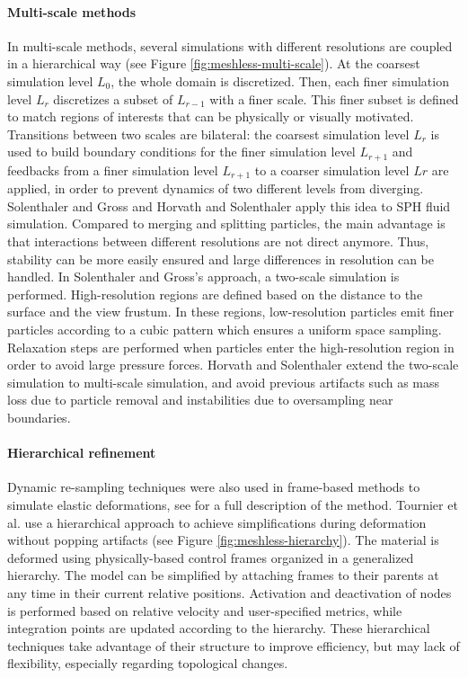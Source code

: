 \paragraph*{Multi-scale methods}
In multi-scale methods, several simulations with different resolutions are coupled in a hierarchical way (see Figure \ref{fig:meshless-multi-scale}).
At the coarsest simulation level $L_{0}$, the whole domain is discretized. Then, each finer simulation level $L_{r}$ discretizes a subset of $L_{r-1}$ with a finer scale. This finer subset is defined to match regions of interests that can be physically or visually motivated. Transitions between two scales are bilateral: the coarsest simulation level $L_{r}$ is used to build boundary conditions for the finer simulation level $L_{r+1}$ and feedbacks from a finer simulation level $L_{r+1}$ to a coarser simulation level $L{r}$ are applied, in order to prevent dynamics of two different levels from diverging. Solenthaler and Gross \cite{Solenthaler2011} and Horvath and Solenthaler \cite{Horvath2013} apply this idea to SPH fluid simulation.
Compared to merging and splitting particles, the main advantage is that interactions between different resolutions are not direct anymore. Thus, stability can be more easily ensured and large differences in resolution can be handled.
In Solenthaler and Gross's approach, a two-scale simulation is performed. High-resolution regions are defined based on the distance to the surface and the view frustum. In these regions, low-resolution particles emit finer particles according to a cubic pattern which ensures a uniform space sampling. Relaxation steps are performed when particles enter the high-resolution region in order to avoid large pressure forces. Horvath and Solenthaler extend the two-scale simulation to multi-scale simulation, and avoid previous artifacts such as mass loss due to particle removal and instabilities due to oversampling near boundaries.

\paragraph*{Hierarchical refinement}
Dynamic re-sampling techniques were also used in frame-based methods to simulate elastic deformations, see \cite{Gilles2011} for a full description of the method. Tournier et al. \cite{Tournier2014} use a hierarchical approach to achieve simplifications during deformation without popping artifacts (see Figure \ref{fig:meshless-hierarchy}). The material is deformed using physically-based control frames organized in a generalized hierarchy. The model can be simplified by attaching frames to their parents at any time in their current relative positions. Activation and deactivation of nodes is performed based on relative velocity and user-specified metrics, while integration points are updated according to the hierarchy. These hierarchical techniques take advantage of their structure to improve efficiency, but may lack of flexibility, especially regarding topological changes.

